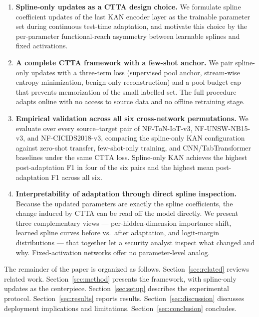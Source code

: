 \documentclass[10pt, conference, letterpaper]{IEEEtran}
\begin{document}
\begin{enumerate}
    \item \textbf{Spline-only updates as a CTTA design choice.} We formulate spline coefficient updates of the last KAN encoder layer as the trainable parameter set during continuous test-time adaptation, and motivate this choice by the per-parameter functional-reach asymmetry between learnable splines and fixed activations.

    \item \textbf{A complete CTTA framework with a few-shot anchor.} We pair spline-only updates with a three-term loss (supervised pool anchor, stream-wise entropy minimization, benign-only reconstruction) and a pool-budget cap that prevents memorization of the small labelled set. The full procedure adapts online with no access to source data and no offline retraining stage.

    \item \textbf{Empirical validation across all six cross-network permutations.} We evaluate over every source--target pair of NF-ToN-IoT-v3, NF-UNSW-NB15-v3, and NF-CICIDS2018-v3, comparing the spline-only KAN configuration against zero-shot transfer, few-shot-only training, and CNN/TabTransformer baselines under the same CTTA loss. Spline-only KAN achieves the highest post-adaptation F1 in four of the six pairs and the highest mean post-adaptation F1 across all six.

    \item \textbf{Interpretability of adaptation through direct spline inspection.} Because the updated parameters are exactly the spline coefficients, the change induced by CTTA can be read off the model directly. We present three complementary views --- per-hidden-dimension importance shift, learned spline curves before vs.\ after adaptation, and logit-margin distributions --- that together let a security analyst inspect what changed and why. Fixed-activation networks offer no parameter-level analog.
\end{enumerate}

The remainder of the paper is organized as follows. Section~\ref{sec:related} reviews related work. Section~\ref{sec:method} presents the framework, with spline-only updates as the centerpiece. Section~\ref{sec:setup} describes the experimental protocol. Section~\ref{sec:results} reports results. Section~\ref{sec:discussion} discusses deployment implications and limitations. Section~\ref{sec:conclusion} concludes.


\end{document}
